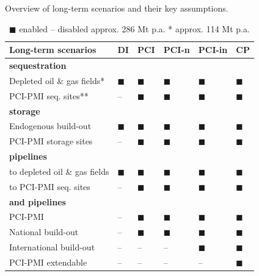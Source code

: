 \documentclass[final,5p,times,twocolumn,sort&compress]{elsarticle}
\begin{document}
\begin{table}[htbp]
  \centering
  \caption{Overview of long-term scenarios and their key assumptions.}
  \label{tab:long-term_scenarios}
  \scriptsize
  \begin{tabularx}{\linewidth}{R{2.6cm}>{\centering\arraybackslash}X>{\centering\arraybackslash}X>{\centering\arraybackslash}X>{\centering\arraybackslash}X>{\centering\arraybackslash}X}
    \toprule
    \textbf{Long-term scenarios} & 
    \textbf{DI} & 
    \textbf{PCI} & 
    \textbf{PCI-n} & 
    \textbf{PCI-in} & 
    \textbf{CP} \\
    \midrule
    \textbf{ sequestration} & & & & & \\
    Depleted oil \& gas fields* & $\blacksquare$ & $\blacksquare$ & $\blacksquare$ & $\blacksquare$ & $\blacksquare$ \\
    PCI-PMI seq. sites** & -- & $\blacksquare$ & $\blacksquare$ & $\blacksquare$ & $\blacksquare$ \\
    \midrule
    \textbf{ storage} & & & & & \\
    Endogenous build-out & $\blacksquare$ & $\blacksquare$ & $\blacksquare$ & $\blacksquare$ & $\blacksquare$ \\
    PCI-PMI storage sites & -- & $\blacksquare$ & $\blacksquare$ & $\blacksquare$ & $\blacksquare$ \\
    \midrule
    \textbf{ pipelines} & & & & & \\
    to depleted oil \& gas fields & $\blacksquare$ & $\blacksquare$ & $\blacksquare$ & $\blacksquare$ & $\blacksquare$ \\
    to PCI-PMI seq. sites & -- & $\blacksquare$ & $\blacksquare$ & $\blacksquare$ & $\blacksquare$ \\
    \midrule
    \textbf{ and  pipelines} & & & & & \\
    PCI-PMI & -- & $\blacksquare$ & $\blacksquare$ & $\blacksquare$ & $\blacksquare$ \\
    National build-out & -- & $\blacksquare$ & $\blacksquare$ & $\blacksquare$ & $\blacksquare$ \\
    International build-out & -- & -- & -- & $\blacksquare$ & $\blacksquare$ \\
    PCI-PMI extendable & -- & -- & -- & -- & $\blacksquare$ \\

    \bottomrule
  \end{tabularx}
  \caption*{\scriptsize $\blacksquare$ enabled \quad -- disabled \quad * approx. 286 Mt p.a. \quad ** approx. 114 Mt p.a.}
\end{table}
\end{document}
